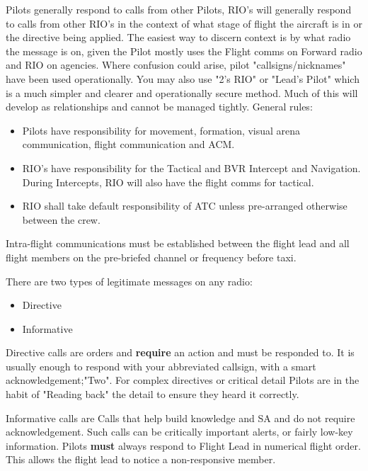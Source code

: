 Pilots generally respond to calls from other Pilots, RIO's will generally
respond to calls from other RIO's in the context of what stage of flight the
aircraft is in or the directive being applied. The easiest way to discern
context is by what radio the message is on, given the Pilot mostly uses the
Flight comms on Forward radio and RIO on agencies. Where confusion could arise,
pilot "callsigns/nicknames" have been used operationally. You may also use "2's
RIO" or "Lead's Pilot" which is a much simpler and clearer and operationally
secure method. Much of this will develop as relationships and cannot be managed
tightly. General rules:

\begin{itemize}

 \item Pilots have responsibility for movement, formation, visual arena
 communication, flight communication and ACM.

 \item RIO's have responsibility for the Tactical and BVR Intercept and
 Navigation. During Intercepts, RIO will also have the flight comms for
 tactical.

 \item RIO shall take default responsibility of ATC unless pre-arranged
 otherwise between the crew.

\end{itemize}

Intra-flight communications must be established between the flight lead and all
flight members on the pre-briefed channel or frequency before taxi.

There are two types of legitimate messages on any radio:

\begin{itemize}
 \item Directive
 \item Informative
\end{itemize}

Directive calls are orders and \textbf{require} an action and must be responded
to. It is usually enough to respond with your abbreviated callsign, with a smart
acknowledgement;"Two". For complex directives or critical detail Pilots are in
the habit of "Reading back" the detail to ensure they heard it correctly.

Informative calls are Calls that help build knowledge and SA and do not require
acknowledgement. Such calls can be critically important alerts, or fairly
low-key information. Pilots \textbf{must} always respond to Flight Lead in
numerical flight order. This allows the flight lead to notice a non-responsive
member.

